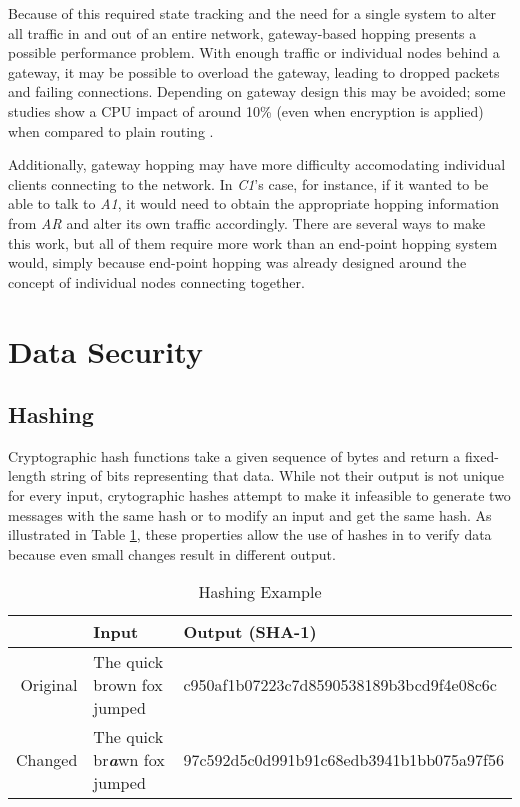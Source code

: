 \par Because of this required state tracking and the need for a single system to alter all traffic in and out of an entire network, gateway-based hopping presents a possible performance problem. With enough traffic or individual nodes behind a gateway, it may be possible to overload the gateway, leading to dropped packets and failing connections. Depending on gateway design this may be avoided; some studies show a CPU impact of around 10\% (even when encryption is applied) when compared to plain routing \cite{TAO}.

\par Additionally, gateway hopping may have more difficulty accomodating individual clients connecting to the network. In \textit{C1}'s case, for instance, if it wanted to be able to talk to \textit{A1}, it would need to obtain the appropriate hopping information from \textit{AR} and alter its own traffic accordingly. There are several ways to make this work, but all of them require more work than an end-point hopping system would, simply because end-point hopping was already designed around the concept of individual nodes connecting together.

\section{Data Security}
\label{sec:data_security}

\subsection{Hashing}
\label{sec:hashing}
\par Cryptographic hash functions take a given sequence of bytes and return a fixed-length string of bits representing that data. While not their output is not unique for every input, crytographic hashes attempt to make it infeasible to generate two messages with the same hash or to modify an input and get the same hash. As illustrated in Table \ref{tbl:hashing_example}, these properties allow the use of hashes in to verify data because even small changes result in different output.

\begin{table}[h]
\caption{Hashing Example}
\label{tbl:hashing_example}
\centering
\begin{tabular}{r|l|l}
	& Input & Output (SHA-1)\\
\hline
Original & The quick brown fox jumped & c950af1b07223c7d8590538189b3bcd9f4e08c6c\\
Changed & The quick br\textit{\textbf{a}}wn fox jumped & 97c592d5c0d991b91c68edb3941b1bb075a97f56
\end{tabular}
\end{table}

